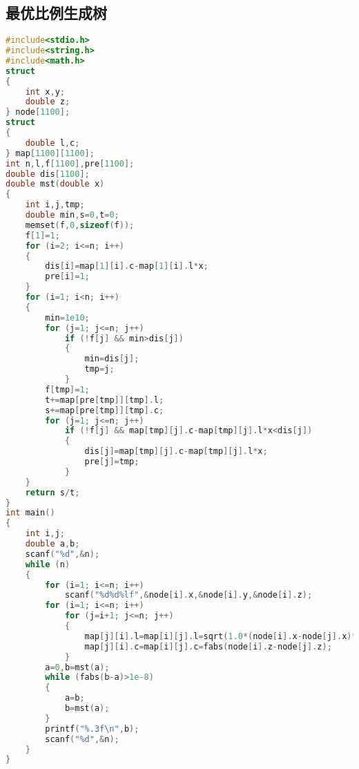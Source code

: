 \subsection{最优比例生成树}
    \begin{lstlisting}[language=c++]
#include<stdio.h>
#include<string.h>
#include<math.h>
struct
{
    int x,y;
    double z;
} node[1100];
struct
{
    double l,c;
} map[1100][1100];
int n,l,f[1100],pre[1100];
double dis[1100];
double mst(double x)
{
    int i,j,tmp;
    double min,s=0,t=0;
    memset(f,0,sizeof(f));
    f[1]=1;
    for (i=2; i<=n; i++)
    {
        dis[i]=map[1][i].c-map[1][i].l*x;
        pre[i]=1;
    }
    for (i=1; i<n; i++)
    {
        min=1e10;
        for (j=1; j<=n; j++)
            if (!f[j] && min>dis[j])
            {
                min=dis[j];
                tmp=j;
            }
        f[tmp]=1;
        t+=map[pre[tmp]][tmp].l;
        s+=map[pre[tmp]][tmp].c;
        for (j=1; j<=n; j++)
            if (!f[j] && map[tmp][j].c-map[tmp][j].l*x<dis[j])
            {
                dis[j]=map[tmp][j].c-map[tmp][j].l*x;
                pre[j]=tmp;
            }
    }
    return s/t;
}
int main()
{
    int i,j;
    double a,b;
    scanf("%d",&n);
    while (n)
    {
        for (i=1; i<=n; i++)
            scanf("%d%d%lf",&node[i].x,&node[i].y,&node[i].z);
        for (i=1; i<=n; i++)
            for (j=i+1; j<=n; j++)
            {
                map[j][i].l=map[i][j].l=sqrt(1.0*(node[i].x-node[j].x)*(node[i].x-node[j].x)+(node[i].y-node[j].y)*(node[i].y-node[j].y));
                map[j][i].c=map[i][j].c=fabs(node[i].z-node[j].z);
            }
        a=0,b=mst(a);
        while (fabs(b-a)>1e-8)
        {
            a=b;
            b=mst(a);
        }
        printf("%.3f\n",b);
        scanf("%d",&n);
    }
}
    \end{lstlisting}
